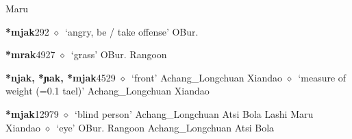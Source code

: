 \begin{list}{}{\leftmargin=1.5em \itemindent=-1.5em}
         Maru 
  \item {\footnotesize \textbf{*mjak}}{\tiny 292}
\hspace{1ex}
         $\diamond$~`angry, be / take offense'
         OBur. 
  \item {\footnotesize \textbf{*mrak}}{\tiny 4927}
\hspace{1ex}
         $\diamond$~`grass'
         OBur. 
\hspace{1ex}
         Rangoon 
  \item {\footnotesize \textbf{*njak, *ɲak, *mjak}}{\tiny 4529}
\hspace{1ex}
         $\diamond$~`front'
         Achang\_Longchuan 
\hspace{1ex}
         Xiandao 
\hspace{1ex}
         $\diamond$~`measure of weight (=0.1 tael)'
         Achang\_Longchuan 
\hspace{1ex}
         Xiandao 
  \item {\footnotesize \textbf{*mjak}}{\tiny 12979}
\hspace{1ex}
         $\diamond$~`blind person'
         Achang\_Longchuan 
\hspace{1ex}
         Atsi 
\hspace{1ex}
         Bola 
\hspace{1ex}
         Lashi 
\hspace{1ex}
         Maru 
\hspace{1ex}
         Xiandao 
\hspace{1ex}
         $\diamond$~`eye'
         OBur. 
\hspace{1ex}
         Rangoon 
\hspace{1ex}
         Achang\_Longchuan 
\hspace{1ex}
         Atsi 
\hspace{1ex}
         Bola 

\end{list}

